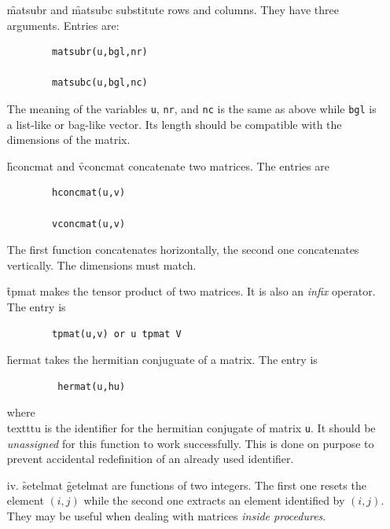 \begin{itemize}
\f{matsubr} and \f{matsubc} substitute rows and columns. They have three arguments.
Entries are:
\begin{verbatim}
        matsubr(u,bgl,nr)

        matsubc(u,bgl,nc)
\end{verbatim}
The meaning of the variables \texttt{u}, \texttt{nr}, and \texttt{nc} is the same as above
while \texttt{bgl} is a list-like or bag-like vector.
Its length should be compatible with the dimensions of the matrix.

\f{hconcmat} and \f{vconcmat} concatenate two matrices. The entries are
\begin{verbatim}
        hconcmat(u,v)

        vconcmat(u,v)
\end{verbatim}
The first function concatenates horizontally, the second one
concatenates vertically. The dimensions must match.

\f{tpmat} makes the tensor product of two matrices. It is also an
\emph{infix} operator. The entry is
\begin{verbatim}
        tpmat(u,v) or u tpmat V
\end{verbatim}
\f{hermat} takes the hermitian conjuguate of a matrix.
The entry is
\begin{verbatim}
         hermat(u,hu)
\end{verbatim}
where \\texttt{u} is the identifier for the hermitian conjugate of matrix \texttt{u}.
It should be \emph{unassigned} for this function to work  successfully.
This is done on  purpose to prevent accidental redefinition of an already
used identifier.
\item[iv.]
\hypertarget{operator:SETELMAT}{}
\hypertarget{operator:GETELMAT}{}
\f{setelmat} \f{getelmat} are functions of two integers. The first one
resets the element $(i,j)$ while the second one extracts an
element identified by $(i,j)$. They may be useful when
dealing with matrices \emph{inside procedures}.
\end{itemize}
